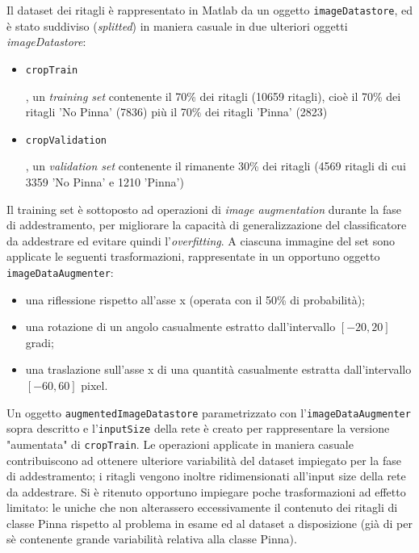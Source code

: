 Il dataset dei ritagli è rappresentato in Matlab da un oggetto \verb|imageDatastore|, ed è stato suddiviso (\textit{splitted}) in maniera casuale in due ulteriori oggetti \textit{imageDatastore}:

\begin{itemize}
\item \begin{frame}\space \verb|cropTrain|\end{frame}, un \textit{training set} contenente il 70\% dei ritagli (10659 ritagli), cioè il 70\% dei ritagli 'No Pinna' (7836) più il 70\% dei ritagli 'Pinna' (2823)
\item \begin{frame}\space \verb|cropValidation|\end{frame}, un \textit{validation set} contenente il rimanente 30\% dei ritagli (4569 ritagli di cui 3359 'No Pinna' e 1210 'Pinna')
\end{itemize}

Il training set è sottoposto ad operazioni di \textit{image augmentation} durante la fase di addestramento, per migliorare la capacità di generalizzazione del classificatore da addestrare ed evitare quindi l'\textit{overfitting}.
A ciascuna immagine del set sono applicate le seguenti trasformazioni, rappresentate in un opportuno oggetto \verb|imageDataAugmenter|:

\begin{itemize}
\item una riflessione rispetto all’asse x (operata con il 50\% di probabilità);
\item una rotazione di un angolo casualmente estratto dall’intervallo $[-20, 20]$ gradi;
\item una traslazione sull’asse x di una quantità casualmente estratta dall’intervallo
$[-60, 60]$ pixel.
\end{itemize}

Un oggetto \verb|augmentedImageDatastore| parametrizzato con l'\verb|imageDataAugmenter|  sopra descritto e l'\verb|inputSize| della rete è creato per rappresentare la versione "aumentata" di \verb|cropTrain|.
Le operazioni applicate in maniera casuale contribuiscono ad ottenere ulteriore variabilità del dataset impiegato per la fase di addestramento; i ritagli vengono inoltre ridimensionati all'input size della rete da addestrare. Si è ritenuto opportuno impiegare poche trasformazioni ad effetto limitato: le uniche che non alterassero eccessivamente il contenuto dei ritagli di classe Pinna rispetto al problema in esame ed al dataset a disposizione (già di per sè contenente grande variabilità relativa alla classe Pinna).

